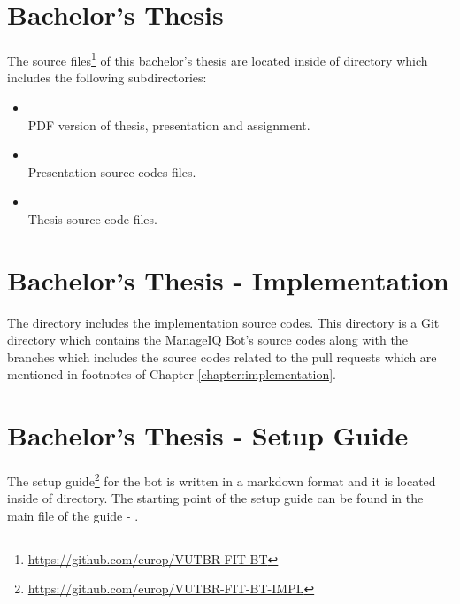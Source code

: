 \section{Bachelor's Thesis}\label{section:BT}

The source files\footnote{\url{https://github.com/europ/VUTBR-FIT-BT}} of this bachelor's thesis are located inside of  directory which includes the following subdirectories:

\begin{itemize}

    \item {}\\[0.2em]
        PDF version of thesis, presentation and assignment.

    \item {}\\[0.2em]
        Presentation source codes files.

    \item {}\\[0.2em]
        Thesis source code files.

\end{itemize}

\section{Bachelor's Thesis - Implementation}\label{section:BT-I}

The  directory includes the implementation source codes. This directory is a Git directory which contains the ManageIQ Bot's source codes along with the branches which includes the source codes related to the pull requests which are mentioned in footnotes of Chapter \ref{chapter:implementation}.

\section{Bachelor's Thesis - Setup Guide}\label{section:BT-SG}

The setup guide\footnote{\url{https://github.com/europ/VUTBR-FIT-BT-IMPL}} for the bot is written in a markdown format and it is located inside of  directory. The starting point of the setup guide can be found in the main file of the guide - .
